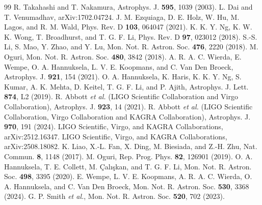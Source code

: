 \begin{thebibliography}{99}
R. Takahashi and T. Nakamura, Astrophys. J. \textbf{595}, 1039 (2003).
L. Dai and T. Venumadhav, arXiv:1702.04724.
J. M. Ezquiaga, D. E. Holz, W. Hu, M. Lagos, and R. M. Wald, Phys. Rev. D \textbf{103}, 064047 (2021).
K. K. Y. Ng, K. W. K. Wong, T. Broadhurst, and T. G. F. Li, Phys. Rev. D \textbf{97}, 023012 (2018).
S.-S. Li, S. Mao, Y. Zhao, and Y. Lu, Mon. Not. R. Astron. Soc. \textbf{476}, 2220 (2018).
M. Oguri, Mon. Not. R. Astron. Soc. \textbf{480}, 3842 (2018).
A. R. A. C. Wierda, E. Wempe, O. A. Hannuksela, L. V. E. Koopmans, and C. Van Den Broeck, Astrophys. J. \textbf{921}, 154 (2021).
O. A. Hannuksela, K. Haris, K. K. Y. Ng, S. Kumar, A. K. Mehta, D. Keitel, T. G. F. Li, and P. Ajith, Astrophys. J. Lett. \textbf{874}, L2 (2019).
R. Abbott \textit{et al.} (LIGO Scientific Collaboration and Virgo Collaboration), Astrophys. J. \textbf{923}, 14 (2021).
R. Abbott \textit{et al.} (LIGO Scientific Collaboration, Virgo Collaboration and KAGRA Collaboration), Astrophys. J. \textbf{970}, 191 (2024).
LIGO Scientific, Virgo, and KAGRA Collaborations, arXiv:2512.16347.
LIGO Scientific, Virgo, and KAGRA Collaborations, arXiv:2508.18082.
K. Liao, X.-L. Fan, X. Ding, M. Biesiada, and Z.-H. Zhu, Nat. Commun. \textbf{8}, 1148 (2017).
M. Oguri, Rep. Prog. Phys. \textbf{82}, 126901 (2019).
O. A. Hannuksela, T. E. Collett, M. {\c{C}}al{\i}{\c{s}}kan, and T. G. F. Li, Mon. Not. R. Astron. Soc. \textbf{498}, 3395 (2020).
E. Wempe, L. V. E. Koopmans, A. R. A. C. Wierda, O. A. Hannuksela, and C. Van Den Broeck, Mon. Not. R. Astron. Soc. \textbf{530}, 3368 (2024).
G. P. Smith \textit{et al.}, Mon. Not. R. Astron. Soc. \textbf{520}, 702 (2023).

\end{thebibliography}
